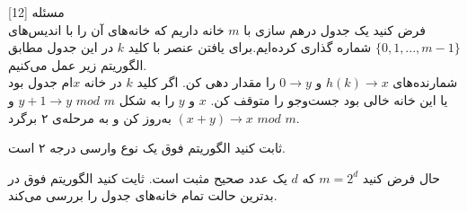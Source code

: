 ‌مسئله [12]
\\
فرض کنید یک جدول درهم سازی با $m$ خانه داریم که خانه‌های آن را با اندیس‌های $\{0,1,...,m-1\}$ شماره گذاری کرده‌ایم.برای یافتن عنصر با کلید $k$ در این جدول مطابق الگوریتم زیر عمل می‌کنیم. \\
  شمارنده‌های $h(k) \to x$ و $0 \to y$ را مقدار دهی کن.
  اگر کلید $k$ در خانه $x$ام جدول بود یا این خانه خالی بود جست‌و‌جو را متوقف کن.
  $x$ و $y$ را به شکل $m$ $mod$ $y+1 \to y$ و $m$ $mod$ $(x+y) \to x$ به‌روز کن و به مرحله‌ی ۲ برگرد.

ثابت کنید الگوریتم فوق یک نوع وارسی درجه ۲ است.

حال فرض کنید $m = 2^d$ که $d$ یک عدد صحیح مثبت است. ثایت کنید الگوریتم فوق در بدترین حالت تمام خانه‌های جدول را بررسی می‌کند.



% 
%
%
% 



